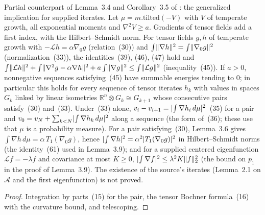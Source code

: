 \begin{lemma}
  \label{lem:bkl-energy-recursion}
  \leanok
  Partial counterpart of Lemma~3.4 and Corollary~3.5 of \cite{BizeulKlartagLehec2026}: the
  generalized implication for supplied iterates.  Let $\mu=m.\mathrm{tilted}(-V)$ with $V$ of temperate growth, all exponential
  moments and $\nabla^2V\ge a$.  Gradients of tensor fields add a first index, with the
  Hilbert--Schmidt norm.  For tensor fields $g,h$ of temperate growth with $-\mathcal Lh=\alpha\nabla_0g$
  (relation~(30)) and $\int\lVert\nabla h\rVert^2=\int\lVert\nabla_0g\rVert^2$ (normalization~(33)), the
  identities~(39), (46), (47) hold and
  $\int\lVert\mathcal Lh\rVert^2+\int\lVert\nabla^2g-\alpha\nabla h\rVert^2+a\int\lVert\nabla g\rVert^2\le\int\lVert\mathcal Lg\rVert^2$
  (inequality~(45)).  If $a>0$, nonnegative sequences satisfying~(45) have summable energies tending
  to $0$; in particular this holds for every sequence of tensor iterates $h_k$ with values in spaces
  $G_k$ linked by linear isometries $\mathbb R^n\otimes G_k\cong G_{k+1}$ whose consecutive pairs
  satisfy~(30) and~(33).  Under~(33) alone, $v_i-v_{i+1}=\lvert\int\nabla h_i\,d\mu\rvert^2$~(35) for a pair
  and $v_0=v_N+\sum_{k<N}\lvert\int\nabla h_k\,d\mu\rvert^2$ along a sequence (the form of~(36); these use that
  $\mu$ is a probability measure).  For a pair satisfying~(30), Lemma~3.6 gives
  $\int\nabla h\,d\mu=\alpha\,T_1(\nabla_0g)$, hence $\lvert\int\nabla h\rvert^2=\alpha^2\lvert T_1(\nabla_0g)\rvert^2$ in
  Hilbert--Schmidt norms (the identity~(61) used in Lemma~3.9); and for a supplied centered
  eigenfunction $\mathcal Lf=-\lambda f$ and covariance at most $K\ge0$,
  $\lvert\int\nabla f\rvert^2\le\lambda^2K\lVert f\rVert_2^2$ (the bound on $p_1$ in the proof of Lemma~3.9).  The existence of the source's iterates (Lemma~2.1 on $\mathcal A$ and
  the first eigenfunction) is not proved.
\end{lemma}
\begin{proof}
  \leanok
  Integration by parts~(15) for the pair, the tensor Bochner formula~(16) with the curvature bound,
  and telescoping.
\end{proof}

